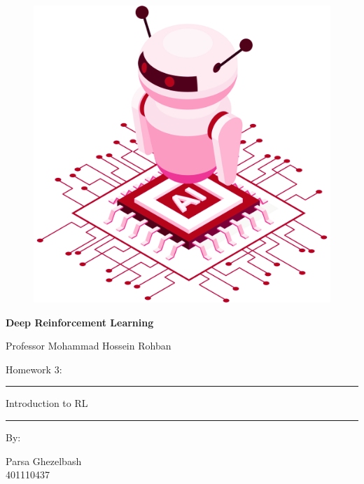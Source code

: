 \documentclass[12pt]{article}
\begin{document}
\thispagestyle{plain}

\begin{center}

\vspace*{-1.5cm}
\begin{figure}[!h]
    \centering
    \includegraphics[width=0.7\linewidth]{figs/cover-std.png}
\end{figure}

{

{\color{DarkBlue} {\fontsize{30}{50} \textbf{
Deep Reinforcement Learning
}}}

{\color{DarkBlue} {\Large
Professor Mohammad Hossein Rohban
}}
}


\vspace{20pt}

{


{\color{RedOrange}
{\Large
Homework 3:
}\\
}
{\color{BrickRed}
\rule{12cm}{0.5pt}

{\Huge
Introduction to RL
}
\rule{12cm}{0.5pt}
}

\vspace{10pt}

{\color{RoyalPurple} { \small By:} } \\
\vspace{10pt}

{\color{Blue} { \LARGE Parsa Ghezelbash } } \\
\vspace{5pt}
{\color{RoyalBlue} { \Large 401110437 } }


}
\end{center}
\end{document}
